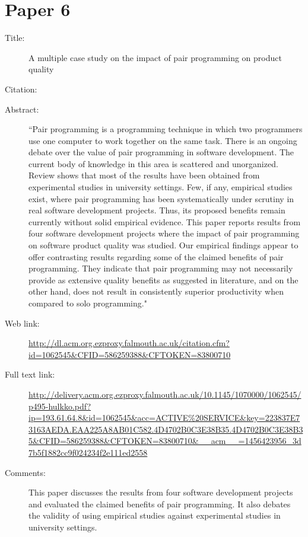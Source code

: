 \documentclass{scrartcl}
\begin{document}
\section*{Paper 6}
\begin{description}
\item[Title:] A multiple case study on the impact of pair programming on product quality
\item[Citation:] \cite{Hulkko:2005}
\item[Abstract:] ``Pair programming is a programming technique in which two programmers use one computer to work together on the same task. There is an ongoing debate over the value of pair programming in software development. The current body of knowledge in this area is scattered and unorganized. Review shows that most of the results have been obtained from experimental studies in university settings. Few, if any, empirical studies exist, where pair programming has been systematically under scrutiny in real software development projects. Thus, its proposed benefits remain currently without solid empirical evidence. This paper reports results from four software development projects where the impact of pair programming on software product quality was studied. Our empirical findings appear to offer contrasting results regarding some of the claimed benefits of pair programming. They indicate that pair programming may not necessarily provide as extensive quality benefits as suggested in literature, and on the other hand, does not result in consistently superior productivity when compared to solo programming."
\item[Web link:] \url{http://dl.acm.org.ezproxy.falmouth.ac.uk/citation.cfm?id=1062545&CFID=586259388&CFTOKEN=83800710}
\item[Full text link:] \url{http://delivery.acm.org.ezproxy.falmouth.ac.uk/10.1145/1070000/1062545/p495-hulkko.pdf?ip=193.61.64.8&id=1062545&acc=ACTIVE%20SERVICE&key=223837E73163AEDA.EAA225A8AB01C582.4D4702B0C3E38B35.4D4702B0C3E38B35&CFID=586259388&CFTOKEN=83800710&__acm__=1456423956_3d7b5f1882cc9f024234f2e111ed2558}
\item[Comments:] This paper discusses the results from four software development projects and evaluated the claimed benefits of pair programming. It also debates the validity of using empirical studies against experimental studies in university settings.
\end{description}



\end{document}
